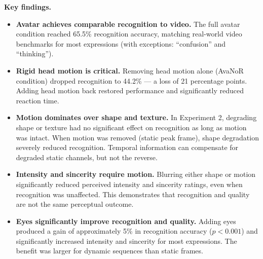 \documentclass[11pt, a4paper]{article}
\begin{document}
\textbf{Key findings.}
\begin{itemize}[leftmargin=2em]
  \item \textbf{Avatar achieves comparable recognition to video.} The full avatar condition reached 65.5\% recognition accuracy, matching real-world video benchmarks for most expressions (with exceptions: ``confusion'' and ``thinking'').
  \item \textbf{Rigid head motion is critical.} Removing head motion alone (AvaNoR condition) dropped recognition to 44.2\% --- a loss of 21 percentage points. Adding head motion back restored performance and significantly reduced reaction time.
  \item \textbf{Motion dominates over shape and texture.} In Experiment 2, degrading shape or texture had no significant effect on recognition as long as motion was intact. When motion was removed (static peak frame), shape degradation severely reduced recognition. Temporal information can compensate for degraded static channels, but not the reverse.
  \item \textbf{Intensity and sincerity require motion.} Blurring either shape or motion significantly reduced perceived intensity and sincerity ratings, even when recognition was unaffected. This demonstrates that recognition and quality are not the same perceptual outcome.
  \item \textbf{Eyes significantly improve recognition and quality.} Adding eyes produced a gain of approximately 5\% in recognition accuracy ($p < 0.001$) and significantly increased intensity and sincerity for most expressions. The benefit was larger for dynamic sequences than static frames.
\end{itemize}
\end{document}
